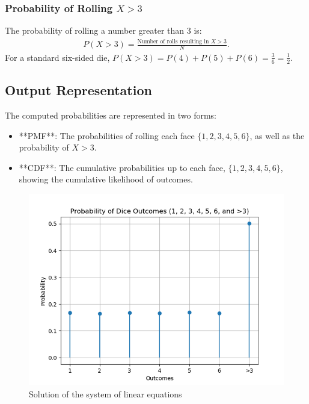 \documentclass[journal]{IEEEtran}
\begin{document}
\subsubsection*{Probability of Rolling \( X > 3 \)}
The probability of rolling a number greater than 3 is:
\begin{align}
P(X > 3) = \frac{\text{Number of rolls resulting in } X > 3}{N}.
\end{align}
For a standard six-sided die, \( P(X > 3) = P(4) + P(5) + P(6) = \frac{3}{6} = \frac{1}{2} \).

\subsection*{Output Representation}
The computed probabilities are represented in two forms:
\begin{itemize}
    \item **PMF**: The probabilities of rolling each face \( \{1, 2, 3, 4, 5, 6\} \), as well as the probability of \( X > 3 \).
    \item **CDF**: The cumulative probabilities up to each face, \( \{1, 2, 3, 4, 5, 6\} \), showing the cumulative likelihood of outcomes.
\end{itemize}
	\begin{figure}[h!]
		\centering
		\includegraphics[width=\columnwidth]{figs/Figure_1.png}
		\caption{Solution of the system of linear equations}
		\label{stemplot}
	\end{figure}
\end{document}
